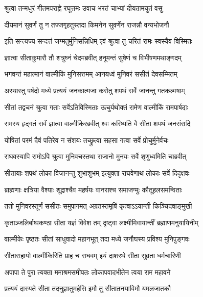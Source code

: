 \twolineshloka
{श्रुत्वा तन्मधुरं गीतमपराह्णे रघूत्तमः}
{उवाच भरतं चाभ्यां दीयतामयुतं वसु} %

\twolineshloka
{दीयमानं सुवर्णं तु न तज्जगृहतुस्तदा}
{किमनेन सुवर्णेन राजन्नौ वन्यभोजनौ} %

\twolineshloka
{इति सन्त्यज्य सन्दत्तं जग्मतुर्मुनिसन्निधिम्}
{एवं श्रुत्वा तु चरितं रामः स्वस्यैव विस्मितः} %

\twolineshloka
{ज्ञात्वा सीताकुमारौ तौ शत्रुघ्नं चेदमब्रवीत्}
{हनूमन्तं सुषेणं च विभीषणमथाङ्गदम्} %

\twolineshloka
{भगवन्तं महात्मानं वाल्मीकिं मुनिसत्तमम्}
{आनयध्वं मुनिवरं ससीतं देवसम्मितम्} %

\twolineshloka
{अस्यास्तु पर्षदो मध्ये प्रत्ययं जनकात्मजा}
{करोतु शपथं सर्वे जानन्तु गतकल्मषाम्} %

\twolineshloka
{सीतां तद्वचनं श्रुत्वा गताः सर्वेऽतिविस्मिताः}
{ऊचुर्यथोक्तं रामेण वाल्मीकिं रामपार्षदाः} %

\twolineshloka
{रामस्य हृद्गतं सर्वं ज्ञात्वा वाल्मीकिरब्रवीत्}
{श्वः करिष्यति वै सीता शपथं जनसंसदि} %

\twolineshloka
{योषितां परमं दैवं पतिरेव न संशयः}
{तच्छ्रुत्वा सहसा गत्वा सर्वे प्रोचुर्मुनेर्वचः} %

\twolineshloka
{राघवस्यापि रामोऽपि श्रुत्वा मुनिवचस्तथा}
{राजानो मुनयः सर्वे शृणुध्वमिति चाब्रवीत्} %

\twolineshloka
{सीतायाः शपथं लोका विजानन्तु शुभाशुभम्}
{इत्युक्ता राघवेणाथ लोकाः सर्वे दिदृक्षवः} %

\twolineshloka
{ब्राह्मणाः क्षत्रिया वैश्याः शूद्राश्चैव महर्षयः}
{वानराश्च समाजग्मुः कौतूहलसमन्विताः} %

\twolineshloka
{ततो मुनिवरस्तूर्णं ससीतः समुपागमत्}
{अग्रतस्तमृषिं कृत्वाऽऽयान्ती किञ्चिदवाङ्मुखी} %

\twolineshloka
{कृताञ्जलिर्बाष्पकण्ठा सीता यज्ञं विवेश तम्}
{दृष्ट्वा लक्ष्मीमिवायान्तीं ब्रह्माणमनुयायिनीम्} %

\twolineshloka
{वाल्मीकेः पृष्ठतः सीतां साधुवादो महानभूत्}
{तदा मध्ये जनौघस्य प्रविश्य मुनिपुङ्गवः} %

\twolineshloka
{सीतासहायो वाल्मीकिरिति प्राह च राघवम्}
{इयं दाशरथे सीता सुव्रता धर्मचारिणी} %

\twolineshloka
{अपापा ते पुरा त्यक्ता ममाश्रमसमीपतः}
{लोकापवादभीतेन त्वया राम महावने} %

\twolineshloka
{प्रत्ययं दास्यते सीता तदनुज्ञातुमर्हसि}
{इमौ तु सीतातनयाविमौ यमलजातकौ} %

